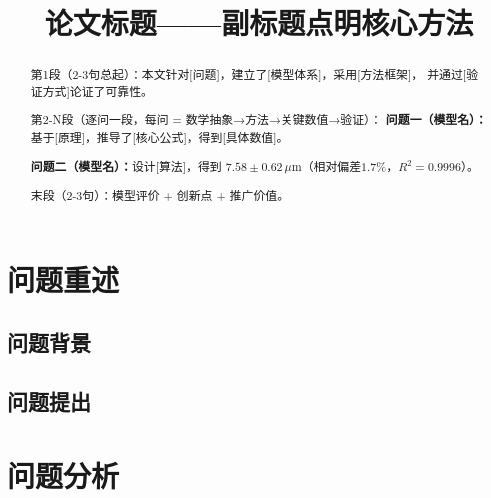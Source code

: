 \documentclass[withoutpreface,bwprint]{cumcmthesis}
\title{论文标题——副标题点明核心方法}
\begin{document}
\maketitle

\begin{abstract}
第1段（2-3句总起）：本文针对[问题]，建立了[模型体系]，采用[方法框架]，
并通过[验证方式]论证了可靠性。

第2-N段（逐问一段，每问 = 数学抽象→方法→关键数值→验证）：
\textbf{问题一（模型名）：}基于[原理]，推导了[核心公式]，得到[具体数值]。

\textbf{问题二（模型名）：}设计[算法]，得到
\textbf{$7.58\pm0.62\,\mu\text{m}$}（相对偏差$1.7\%$，$R^2=0.9996$）。

末段（2-3句）：模型评价 + 创新点 + 推广价值。

\keywords{\textbf{[关键词1]\quad [关键词2]\quad [关键词3]\quad [关键词4]\quad [关键词5]}}
\end{abstract}

\tableofcontents   %

\section{问题重述}
\subsection{问题背景}
\subsection{问题提出}

\section{问题分析}
\end{document}
